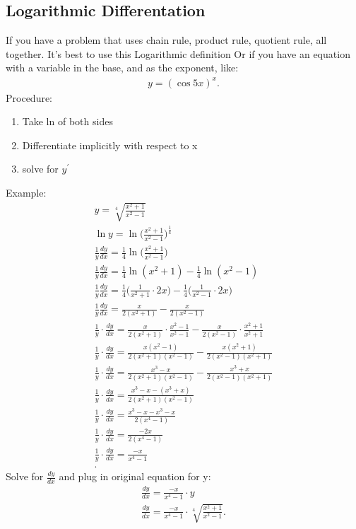 \documentclass{report}
\begin{document}
    \subsection{Logarithmic Differentation}
    \bigbreak \noindent 
    If you have a problem that uses chain rule, product rule, quotient rule, all together. It's best to use this Logarithmic definition
    \bigbreak \noindent 
    Or if you have an equation with a variable in the base, and as the exponent, like:
    \begin{align*}
      y  = (\cos{5x})^{x}
    .\end{align*}
    \bigbreak \noindent \bigbreak \noindent 
    Procedure:
    \begin{enumerate}
      \item Take ln of both sides
      \item Differentiate implicitly with respect to x
      \item solve for $y^{\prime} $
    \end{enumerate}
    Example:
    \begin{align*}
      y = \sqrt[4]{\frac{x^{2}+1}{x^{2}-1}} \\
      \ln{y} = \ln{\bigg({\frac{x^{2}+1}{x^{2}-1}}\bigg)^{\frac{1}{4}}} \\
      \frac{1}{y}\frac{dy}{dx} = \frac{1}{4}\ln{\bigg({\frac{x^{2}+1}{x^{2}-1}}\bigg)} \\
      \frac{1}{y}\frac{dy}{dx} = \frac{1}{4}\ln{(x^{2}+1)} - \frac{1}{4}\ln{(x^{2}-1)} \\
      \frac{1}{y}\frac{dy}{dx} = \frac{1}{4}\bigg(\frac{1}{x^{2}+1} \cdot 2x\bigg) - \frac{1}{4}\bigg(\frac{1}{x^{2}-1} \cdot 2x\bigg) \\
      \frac{1}{y}\frac{dy}{dx} = \frac{x}{2(x^{2}+1)} - \frac{x}{2(x^{2} -1)} \\
      \frac{1}{y}\cdot \frac{dy}{dx} = \frac{x}{2(x^{2}+1)} \cdot \frac{x^{2}-1}{x^{2} -1} - \frac{x}{2(x^{2} -1)} \cdot \frac{x^{2}+1}{x^{2}+1}\\
      \frac{1}{y}\cdot \frac{dy}{dx} = \frac{x(x^{2}-1)}{2(x^{2}+1)(x^{2}-1)}  - \frac{x(x^{2}+1)}{2(x^{2} -1)(x^{2}+1)} \\
      \frac{1}{y}\cdot \frac{dy}{dx} = \frac{x^{3}-x}{2(x^{2}+1)(x^{2}-1)}  - \frac{x^{3}+x}{2(x^{2} -1)(x^{2}+1)} \\
      \frac{1}{y}\cdot \frac{dy}{dx} = \frac{x^{3}-x-(x^{3}+x)}{2(x^{2}+1)(x^{2}-1)}   \\
      \frac{1}{y}\cdot \frac{dy}{dx} = \frac{x^{3}-x-x^{3}-x}{2(x^{4}-1)}   \\
      \frac{1}{y}\cdot \frac{dy}{dx} = \frac{-2x}{2(x^{4}-1)}   \\
      \frac{1}{y}\cdot \frac{dy}{dx} = \frac{-x}{x^{4}-1}   \\
    .\end{align*}
    Solve for $\frac{dy}{dx}$ and plug in original equation for y:
    \begin{align*}
      \frac{dy}{dx} = \frac{-x}{x^{4}-1} \cdot y \\
      \frac{dy}{dx} = \frac{-x}{x^{4}-1} \cdot \sqrt[4]{\frac{x^{2}+1}{x^{2}-1}}
    .\end{align*}
\end{document}
